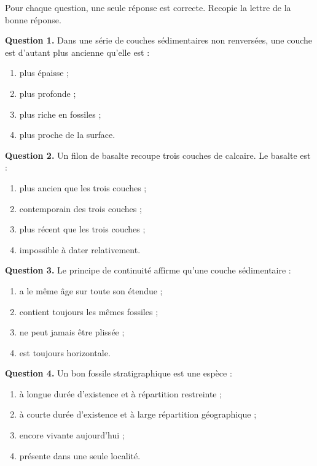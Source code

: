 \documentclass[11pt]{article}
\begin{document}
\begin{exercice}
Pour chaque question, une seule réponse est correcte. Recopie la lettre de la bonne réponse.

\textbf{Question 1.} Dans une série de couches sédimentaires non renversées, une couche est d'autant plus ancienne qu'elle est :
\begin{enumerate}[label=\alph*)]
\item plus épaisse ;
\item plus profonde ;
\item plus riche en fossiles ;
\item plus proche de la surface.
\end{enumerate}

\textbf{Question 2.} Un filon de basalte recoupe trois couches de calcaire. Le basalte est :
\begin{enumerate}[label=\alph*)]
\item plus ancien que les trois couches ;
\item contemporain des trois couches ;
\item plus récent que les trois couches ;
\item impossible à dater relativement.
\end{enumerate}

\textbf{Question 3.} Le principe de continuité affirme qu'une couche sédimentaire :
\begin{enumerate}[label=\alph*)]
\item a le même âge sur toute son étendue ;
\item contient toujours les mêmes fossiles ;
\item ne peut jamais être plissée ;
\item est toujours horizontale.
\end{enumerate}

\textbf{Question 4.} Un bon fossile stratigraphique est une espèce :
\begin{enumerate}[label=\alph*)]
\item à longue durée d'existence et à répartition restreinte ;
\item à courte durée d'existence et à large répartition géographique ;
\item encore vivante aujourd'hui ;
\item présente dans une seule localité.
\end{enumerate}
\end{exercice}
\end{document}
